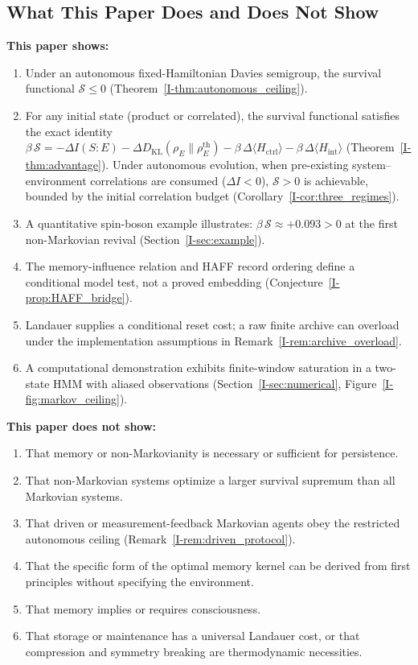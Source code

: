 \documentclass[12pt,a4paper,openany]{book}
\begin{document}
\subsection{What This Paper Does and Does Not Show}

\textbf{This paper shows:}
\begin{enumerate}
\item Under an autonomous fixed-Hamiltonian Davies semigroup,
  the survival functional $\mathcal{S} \leq 0$
  (Theorem~\ref{I-thm:autonomous_ceiling}).
\item For any initial state (product or correlated), the
  survival functional satisfies the exact identity
  $\beta\,\mathcal{S} = -\Delta I(S{:}E)
  - \Delta D_{\mathrm{KL}}(\rho_E \| \rho_E^{\mathrm{th}})
  - \beta\,\Delta\langle H_{\mathrm{ctrl}}\rangle
  - \beta\,\Delta\langle H_{\mathrm{int}}\rangle$
  (Theorem~\ref{I-thm:advantage}).
  Under autonomous evolution, when pre-existing
  system--environment correlations are consumed
  ($\Delta I < 0$), $\mathcal{S} > 0$ is achievable,
  bounded by the initial correlation budget
  (Corollary~\ref{I-cor:three_regimes}).
\item A quantitative spin-boson example illustrates:
  $\beta\,\mathcal{S} \approx +0.093 > 0$ at the first
  non-Markovian revival (Section~\ref{I-sec:example}).
\item The memory-influence relation and HAFF record ordering define a
  conditional model test, not a proved embedding
  (Conjecture~\ref{I-prop:HAFF_bridge}).
\item Landauer supplies a conditional reset cost; a raw finite archive
  can overload under the implementation assumptions in
  Remark~\ref{I-rem:archive_overload}.
\item A computational demonstration exhibits finite-window saturation
  in a two-state HMM with aliased observations
  (Section~\ref{I-sec:numerical},
  Figure~\ref{I-fig:markov_ceiling}).
\end{enumerate}

\textbf{This paper does not show:}
\begin{enumerate}
\item That memory or non-Markovianity is necessary or sufficient for
  persistence.
\item That non-Markovian systems optimize a larger survival supremum
  than all Markovian systems.
\item That driven or measurement-feedback Markovian agents obey the
  restricted autonomous ceiling (Remark~\ref{I-rem:driven_protocol}).
\item That the specific form of the optimal memory kernel can be
  derived from first principles without specifying the
  environment.
\item That memory implies or requires consciousness.
\item That storage or maintenance has a universal Landauer cost, or
  that compression and symmetry breaking are thermodynamic necessities.
\end{enumerate}
\end{document}
